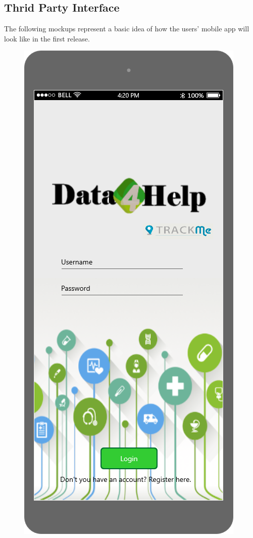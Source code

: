 \subsection{Thrid Party Interface}

The following mockups represent a basic idea of how the users' mobile app will look like in the first 
release. 

\begin{figure}[h!]
	\centering
 	 \begin{minipage}[b]{0.2\textwidth}
    		\includegraphics[width=\textwidth]{./pictures/login_3p.png}

\end{minipage}
\end{figure}

